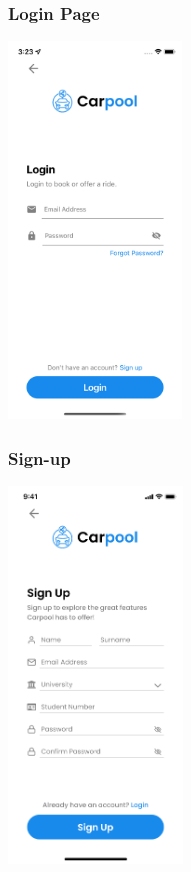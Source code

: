 \documentclass[hidelinks, 12pt, a4paper]{article}
\begin{document}
\subsubsection{Login Page}
\begin{center}
  \includegraphics[height=10cm]{images/Simulator Screen Shot - iPhone X - 2022-06-10 at 03.23.09.png}
\end{center}
\vspace{1cm}
\subsubsection{Sign-up}
\begin{center}
  \includegraphics[height=10cm]{images/Register.png}
\end{center}
\vspace{1cm}
\end{document}
